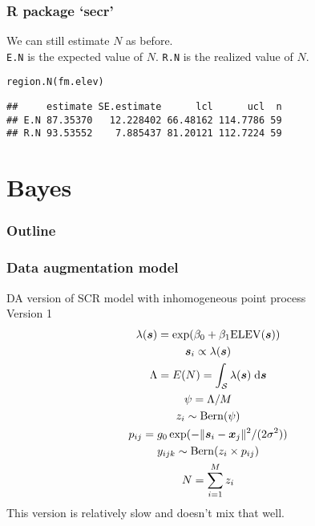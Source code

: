 \documentclass[color=usenames,dvipsnames]{beamer}\usepackage[]{graphicx}\usepackage[]{xcolor}
\makeatletter
\newcommand{\hlstd}[1]{\textcolor[rgb]{0,0,0}{#1}}%
\newcommand{\hlkwd}[1]{\textcolor[rgb]{0.004,0.004,0.506}{#1}}%
\newenvironment{kframe}{%
 \def\at@end@of@kframe{}%
 \ifinner\ifhmode%
  \def\at@end@of@kframe{\end{minipage}}%
  \begin{minipage}{\columnwidth}%
 \fi\fi%
 \def\FrameCommand##1{\hskip\@totalleftmargin \hskip-\fboxsep
 \colorbox{shadecolor}{##1}\hskip-\fboxsep
     \hskip-\linewidth \hskip-\@totalleftmargin \hskip\columnwidth}%
 \MakeFramed {\advance\hsize-\width
   \@totalleftmargin\z@ \linewidth\hsize
   \@setminipage}}%
 {\par\unskip\endMakeFramed%
 \at@end@of@kframe}
\newenvironment{knitrout}{}{} %
\newcommand{\inr}[1]{\colorbox{inlinecolor}{\texttt{#1}}}
\makeatother
\begin{document}
\begin{frame}[fragile]
  \frametitle{R package `secr'}
  We can still estimate $N$ as before. \\
  \vfill
  \inr{E.N} is the expected value of
  $N$. \inr{R.N} is the realized value of $N$. 
  \vfill
\begin{knitrout}\small
{}\color{fgcolor}\begin{kframe}
\begin{alltt}
\hlkwd{region.N}\hlstd{(fm.elev)}
\end{alltt}
\begin{verbatim}
##     estimate SE.estimate      lcl      ucl  n
## E.N 87.35370   12.228402 66.48162 114.7786 59
## R.N 93.53552    7.885437 81.20121 112.7224 59
\end{verbatim}
\end{kframe}
\end{knitrout}
\end{frame}




\section{Bayes}




\begin{frame}
  \frametitle{Outline}
  \Large
  \tableofcontents[currentsection]
\end{frame}





\begin{frame}
  \frametitle{Data augmentation model}
  DA version of SCR model with inhomogeneous point process \\
  \centering
  Version 1 \\
  \begin{gather*}
    \lambda({\bm s}) = \exp(\beta_0 + \beta_1 \mathrm{ELEV}({\bm s})) \\
    {\bm s}_i \propto \lambda({\bm s}) \\
    \Lambda = E(N) = \int_{\mathcal{S}} \lambda({\bm s})\; \mathrm{d}{\bm s} \\
    \psi = \Lambda/M \\
    z_i \sim \mathrm{Bern}(\psi) \\
    p_{ij} = g_0\exp(-\|{\bm s}_i-{\bm x}_j\|^2/(2\sigma^2)) \\
    y_{ijk} \sim \mathrm{Bern}(z_i\times p_{ij}) \\
    N=\sum_{i=1}^M z_i
  \end{gather*}
  \pause \vfill
  This version is relatively slow and doesn't mix that well. \\
\end{frame}
\end{document}
